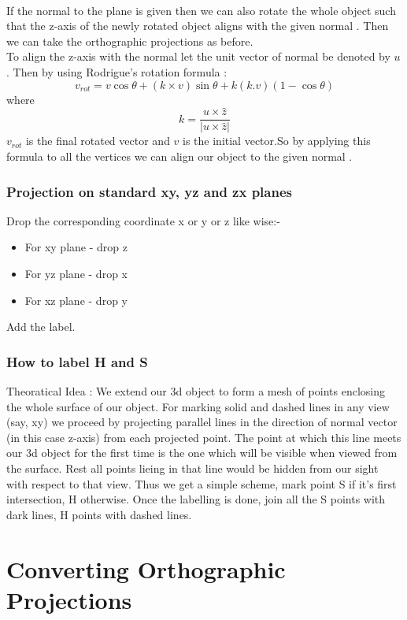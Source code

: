 \documentclass{article}
\begin{document}
\begin{flushleft}
\\If the normal to the plane is given then we can also rotate the whole object such that the z-axis of the newly rotated object aligns with the given normal . Then we can take the orthographic projections as before.
\\To align the z-axis with the normal let the unit vector of normal be denoted by $u$. Then by using Rodrigue's rotation formula :
$$v_{rot} = v\cos\theta + (k \times v )\sin\theta + k(k.v)(1-\cos\theta)$$
where $$k=\frac{u\times\hat{z}}{|u\times\hat{z}|} $$
$v_{rot}$ is the final rotated vector and $v$ is the initial vector.So by applying this formula to all the vertices we can align our object to the given normal .
\end{flushleft}
\section{Projection on standard xy, yz and zx planes}
Drop the corresponding coordinate x or y or z like wise:-
\begin{itemize}
\item For xy plane - drop z
\item For yz plane - drop x
\item For xz plane - drop y
\end{itemize}
Add the label.

\section{How to label H and S}
Theoratical Idea : We extend our 3d object to form a mesh of points enclosing the whole surface of our object. For marking solid and dashed lines in any view (say, xy) we proceed by projecting parallel lines in the direction of normal vector (in this case z-axis) from each projected point. The point at which this line meets our 3d object for the first time is the one which will be visible when viewed from the surface. Rest all points lieing in that line would be hidden from our sight with respect to that view. Thus we get a simple scheme, mark point S if it's first intersection, H otherwise. 
Once the labelling is done, join all the S points with dark lines, H points with dashed lines.


\part{Converting Orthographic Projections}
\setcounter{section}{0}
\end{document}
